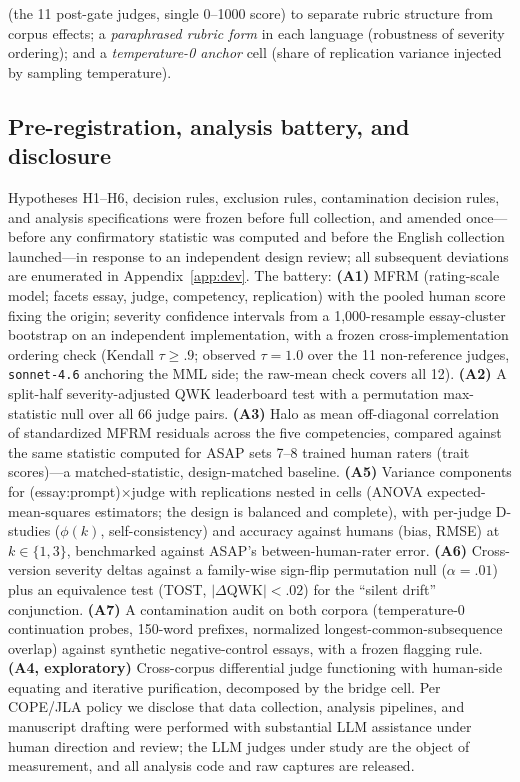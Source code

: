 \documentclass[fleqn,10pt]{JLA_article}
\begin{document}
(the 11 post-gate judges, single 0--1000 score) to separate rubric structure from corpus effects; a
\emph{paraphrased rubric form} in each language (robustness of severity ordering); and a
\emph{temperature-0 anchor} cell (share of replication variance injected by sampling temperature).

\subsection{Pre-registration, analysis battery, and disclosure}
Hypotheses H1--H6, decision rules, exclusion rules, contamination decision rules, and analysis
specifications were frozen before full collection, and amended once---before any confirmatory
statistic was computed and before the English collection launched---in response to an independent
design review; all subsequent deviations are enumerated in Appendix~\ref{app:dev}. The battery:
\textbf{(A1)} MFRM (rating-scale model; facets essay, judge, competency, replication) with the
pooled human score fixing the origin; severity confidence intervals from a 1,000-resample
essay-cluster bootstrap on an independent implementation, with a frozen cross-implementation
ordering check (Kendall $\tau \geq .9$; observed $\tau = 1.0$ over the 11 non-reference judges, \texttt{sonnet-4.6} anchoring the MML side; the raw-mean check covers all 12).
\textbf{(A2)} A split-half severity-adjusted QWK leaderboard test with a permutation
max-statistic null over all 66 judge pairs.
\textbf{(A3)} Halo as mean off-diagonal correlation of standardized MFRM residuals across the
five competencies, compared against the same statistic computed for ASAP sets 7--8 trained human
raters (trait scores)---a matched-statistic, design-matched baseline.
\textbf{(A5)} Variance components for (essay:prompt)$\times$judge with replications nested in
cells (ANOVA expected-mean-squares estimators; the design is balanced and complete), with
per-judge D-studies ($\phi(k)$, self-consistency) and accuracy against humans (bias, RMSE) at
$k \in \{1,3\}$, benchmarked against ASAP's between-human-rater error.
\textbf{(A6)} Cross-version severity deltas against a family-wise sign-flip permutation null
($\alpha{=}.01$) plus an equivalence test (TOST, $|\Delta\text{QWK}|<.02$) for the ``silent
drift'' conjunction.
\textbf{(A7)} A contamination audit on both corpora (temperature-0 continuation probes, 150-word
prefixes, normalized longest-common-subsequence overlap) against synthetic negative-control
essays, with a frozen flagging rule. \textbf{(A4, exploratory)} Cross-corpus differential judge functioning with human-side equating and iterative purification, decomposed by the bridge cell.
Per COPE/JLA policy we disclose that data collection, analysis pipelines, and manuscript drafting
were performed with substantial LLM assistance under human direction and review; the LLM judges
under study are the object of measurement, and all analysis code and raw captures are released.
\end{document}
